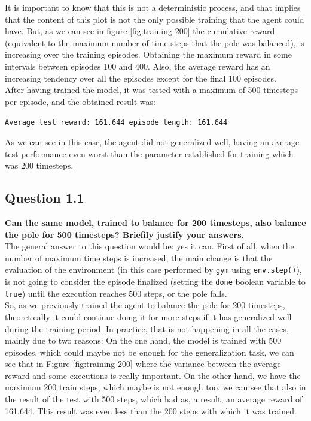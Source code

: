 \documentclass[12pt]{article}
\begin{document}
It is important to know that this is not a deterministic process, and that implies that the content of this plot is not the only possible training that the agent could have. But, as we can see in figure \ref{fig:training-200} the cumulative reward (equivalent to the maximum number of time steps that the pole was balanced), is increasing over the training episodes. Obtaining the maximum reward in some intervals between episodes 100 and 400. Also, the average reward has an increasing tendency over all the episodes except for the final 100 episodes. \\

After having trained the model, it was tested with a maximum of 500 timesteps per episode, and the obtained result was:

\begin{center}
    \texttt{Average test reward: 161.644 episode length: 161.644}
\end{center}

As we can see in this case, the agent did not generalized well, having an average test performance even worst than the parameter established for training which was 200 timesteps.

\subsection{Question 1.1}
\label{sec:question-1.1}
\textbf {
    Can the same model, trained to balance for 200 timesteps, also balance the pole for 500 timesteps? Briefily justify your answers.
}\\

The general answer to this question would be: yes it can. First of all, when the number of maximum time steps is increased, the main change is that the evaluation of the environment (in this case performed by \texttt{gym} using \texttt{env.step()}), is not going to consider the episode finalized (setting the \texttt{done} boolean variable to \texttt{true}) until the execution reaches 500 steps, or the pole falls.\\

So, as we previously trained the agent to balance the pole for 200 timesteps, theoretically it could continue doing it for more steps if it has generalized well during the training period. In practice, that is not happening in all the cases, mainly due to two reasons: On the one hand, the model is trained with 500 episodes, which could maybe not be enough for the generalization task, we can see that in Figure \ref{fig:training-200} where the variance between the average reward and some executions is really important. On the other hand, we have the maximum 200 train steps, which maybe is not enough too, we can see that also in the result of the test with 500 steps, which had as, a result, an average reward of 161.644. This result was even less than the 200 steps with which it was trained. 
\end{document}
